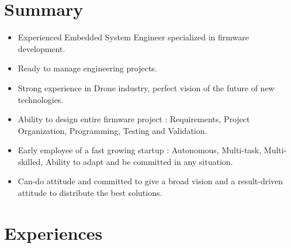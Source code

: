 \documentclass[a4paper]{friggeri-cv} %
\begin{document}
\section{Summary}
\begin{itemize}
\item Experienced Embedded System Engineer specialized in firmware development.
\item Ready to manage engineering projects.
\item Strong experience in Drone industry, perfect vision of the future of new technologies. 
\item Ability to design entire firmware project : Requirements, Project Organization, Programming, Testing and Validation.
\item Early employee of a fast growing startup : Autonomous, Multi-task, Multi-skilled, Ability to adapt and be committed in any situation.
\item Can-do attitude and committed to give a broad vision and a result-driven attitude to distribute the best solutions.
\end{itemize}



\section{Experiences}
\end{document}
